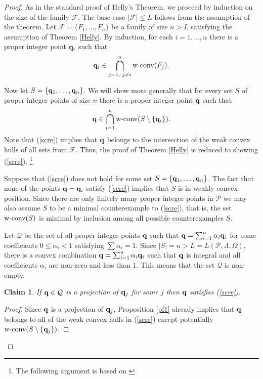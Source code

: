 \documentclass{daj}
\renewcommand{\le}{\leqslant}
\newcommand{\F}{\mathcal F}
\renewcommand{\P}{\mathcal P}
\newcommand{\wc}{\mbox{\rm w-conv}}
\newtheorem{claim}[theorem]{Claim}
\theoremstyle{definition}
\theoremstyle{remark}
\theoremstyle{definition}
\theoremstyle{definition}
\begin{document}
\begin{proof}

As in the standard proof of Helly's Theorem, we proceed by induction on the size of the family $\F$. The base case $|\F| \le L$ follows from the assumption of the theorem. Let $\F = \{F_1, \ldots, F_n\}$ be a family of size $n > L$ satisfying the assumption of Theorem \ref{Helly}. By induction, for each $i = 1, \ldots, n$ there is a proper integer point ${\bf q}_i$ such that
$$
{\bf q}_i \in \bigcap_{j = 1,~ j \neq i}^n \wc(F_j).
$$

Now let $S = \{ {\bf q}_1, \ldots, {\bf q}_n\}$. We will show more generally that for every set $S$ of proper integer points of size $n$ there is a proper integer point ${\bf q}$ such that
\begin{equation}\label{scre}
    {\bf q} \in \bigcap_{i=1}^n \wc(S\setminus \{{\bf q}_i\}).
\end{equation}
Note that (\ref{scre}) implies that ${\bf q}$ belongs to the intersection of the weak convex hulls of all sets from $\F$. Thus, the proof of Theorem \ref{Helly} is reduced to showing (\ref{scre}). \footnote{The following argument is based on \cite[Proof of Proposition 4.2]{D}}

Suppose that (\ref{scre}) does not hold for some set $S = \{{\bf q}_1, \ldots, {\bf q}_n\}$. The fact that none of the points ${\bf q} = {\bf q}_i$ satisfy (\ref{scre}) implies that $S$ is in weakly convex position. Since there are only finitely many proper integer points in $\P$ we may also assume $S$ to be a minimal counterexample to (\ref{scre}), that is, the set $\wc(S)$ is minimal by inclusion among all possible counterexamples $S$.

Let $\mathcal Q$ be the set of all proper integer points ${\bf q}$ such that ${\bf q} = \sum_{i=1}^n \alpha_i {\bf q}_i$ for some coefficients $0\le \alpha_i< 1$ satisfying $\sum \alpha_i = 1$. 
Since $|S| = n > L = L(\P, \Lambda, \Omega)$, there is a convex combination ${\bf q} = \sum_{i=1}^n \alpha_i {\bf q}_i$ such that ${\bf q}$ is integral and all coefficients $\alpha_i$ are non-zero and less than $1$. This means that the set $\mathcal Q$ is non-empty.

\begin{claim}\label{projc}
If ${\bf q} \in \mathcal Q$ is a projection of ${\bf q}_j$ for some $j$ then ${\bf q}$ satisfies (\ref{scre}).
\end{claim}

\begin{proof}
Since ${\bf q}$ is a projection of ${\bf q}_j$, Proposition \ref{pf1} already implies that ${\bf q}$ belongs to all of the weak convex hulls in (\ref{scre}) except potentially $\wc(S\setminus \{{\bf q}_j\})$. 


\end{proof}
\end{proof}
\end{document}
